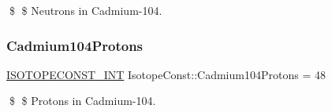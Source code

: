 \$ \$ Neutrons in Cadmium-\/104. \mbox{\label{group___isotope_const-_cadmium-_cd104_gafbf789ef3010810710f014621dc96f15}} 
\subsubsection{\texorpdfstring{Cadmium104\+Protons}{Cadmium104Protons}}
{\footnotesize\ttfamily \mbox{\hyperlink{group___isotope_const-_macros_ga5f18360b3e99483a35c32d789e62621c}{I\+S\+O\+T\+O\+P\+E\+C\+O\+N\+S\+T\+\_\+\+I\+NT}} Isotope\+Const\+::\+Cadmium104\+Protons = 48}

\$ \$ Protons in Cadmium-\/104. 